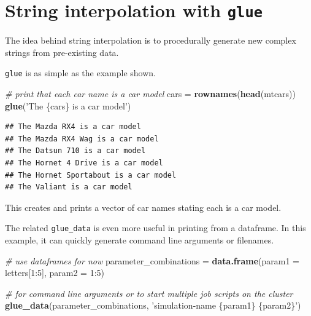 \documentclass[]{book}
\newenvironment{Shaded}{}{}
\newcommand{\CommentTok}[1]{\textcolor[rgb]{0.38,0.63,0.69}{\textit{#1}}}
\newcommand{\DataTypeTok}[1]{\textcolor[rgb]{0.56,0.13,0.00}{#1}}
\newcommand{\DecValTok}[1]{\textcolor[rgb]{0.25,0.63,0.44}{#1}}
\newcommand{\KeywordTok}[1]{\textcolor[rgb]{0.00,0.44,0.13}{\textbf{#1}}}
\newcommand{\NormalTok}[1]{#1}
\newcommand{\OperatorTok}[1]{\textcolor[rgb]{0.40,0.40,0.40}{#1}}
\newcommand{\StringTok}[1]{\textcolor[rgb]{0.25,0.44,0.63}{#1}}
\begin{document}
\hypertarget{string-interpolation-with-glue}{%
\section{\texorpdfstring{String interpolation with \texttt{glue}}{String interpolation with glue}}\label{string-interpolation-with-glue}}

The idea behind string interpolation is to procedurally generate new complex strings from pre-existing data.

\texttt{glue} is as simple as the example shown.

\begin{Shaded}
\begin{Highlighting}[]
\CommentTok{# print that each car name is a car model}
\NormalTok{cars =}\StringTok{ }\KeywordTok{rownames}\NormalTok{(}\KeywordTok{head}\NormalTok{(mtcars))}
\KeywordTok{glue}\NormalTok{(}\StringTok{'The \{cars\} is a car model'}\NormalTok{)}
\end{Highlighting}
\end{Shaded}

\begin{verbatim}
## The Mazda RX4 is a car model
## The Mazda RX4 Wag is a car model
## The Datsun 710 is a car model
## The Hornet 4 Drive is a car model
## The Hornet Sportabout is a car model
## The Valiant is a car model
\end{verbatim}

This creates and prints a vector of car names stating each is a car model.

The related \texttt{glue\_data} is even more useful in printing from a dataframe.
In this example, it can quickly generate command line arguments or filenames.

\begin{Shaded}
\begin{Highlighting}[]
\CommentTok{# use dataframes for now}
\NormalTok{parameter_combinations =}\StringTok{ }\KeywordTok{data.frame}\NormalTok{(}\DataTypeTok{param1 =}\NormalTok{ letters[}\DecValTok{1}\OperatorTok{:}\DecValTok{5}\NormalTok{],}
                                    \DataTypeTok{param2 =} \DecValTok{1}\OperatorTok{:}\DecValTok{5}\NormalTok{)}

\CommentTok{# for command line arguments or to start multiple job scripts on the cluster}
\KeywordTok{glue_data}\NormalTok{(parameter_combinations,}
          \StringTok{'simulation-name \{param1\} \{param2\}'}\NormalTok{)}
\end{Highlighting}
\end{Shaded}
\end{document}
